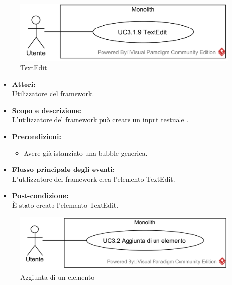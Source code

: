 \begin{samepage}
\nopagebreak
\begin{figure}[H]
	\centering
	\includegraphics[width=15cm]{../../documenti/AnalisiDeiRequisiti/Diagrammi_img/usecase/uc1_33.png}
	\caption{\UCFFCaption{} TextEdit}
\end{figure}
\end{samepage}

\begin{itemize}
	\item \textbf{Attori:}
	\\Utilizzatore del framework.
	\item \textbf{Scopo e descrizione:} 
	\\L'utilizzatore del framework può creare un input testuale .
	\item \textbf{Precondizioni:}
	\begin{itemize}
		\item Avere già istanziato una bubble generica.
	\end{itemize}
	\item \textbf{Flusso principale degli eventi:}
	\\L'utilizzatore del framework crea l'elemento TextEdit.
	\item \textbf{Post-condizione:}
	\\È stato creato l'elemento TextEdit.
\end{itemize}

\begin{samepage}
\nopagebreak
\begin{figure}[H]
	\centering
	\includegraphics[width=15cm]{../../documenti/AnalisiDeiRequisiti/Diagrammi_img/usecase/uc1_04.png}
	\caption{\UCFCaption{} Aggiunta di un elemento}
\end{figure}
\end{samepage}

